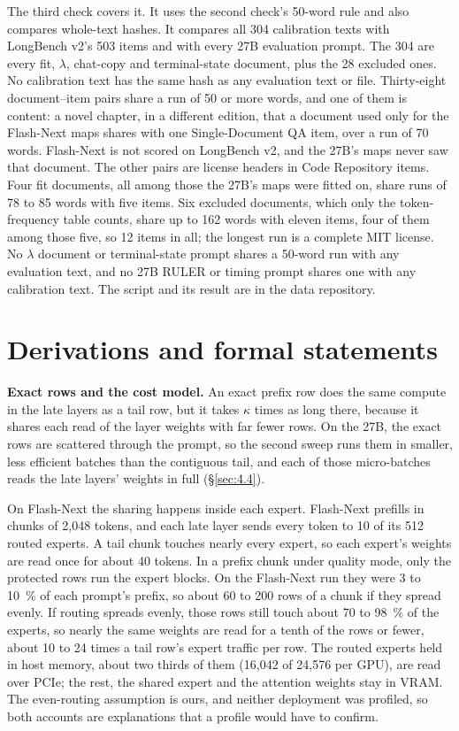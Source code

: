 \documentclass[11pt]{article}
\begin{document}
The third check covers it. It uses the second check's 50-word rule and also compares whole-text hashes. It compares all 304 calibration texts with LongBench v2's 503 items and with every 27B evaluation prompt. The 304 are every fit, $\lambda$, chat-copy and terminal-state document, plus the 28 excluded ones. No calibration text has the same hash as any evaluation text or file. Thirty-eight document--item pairs share a run of 50 or more words, and one of them is content: a novel chapter, in a different edition, that a document used only for the Flash-Next maps shares with one Single-Document QA item, over a run of 70 words. Flash-Next is not scored on LongBench v2, and the 27B's maps never saw that document. The other pairs are license headers in Code Repository items. Four fit documents, all among those the 27B's maps were fitted on, share runs of 78 to 85 words with five items. Six excluded documents, which only the token-frequency table counts, share up to 162 words with eleven items, four of them among those five, so 12 items in all; the longest run is a complete MIT license. No $\lambda$ document or terminal-state prompt shares a 50-word run with any evaluation text, and no 27B RULER or timing prompt shares one with any calibration text. The script and its result are in the data repository.


\section{Derivations and formal statements}\label{app:H}
\textbf{Exact rows and the cost model.} An exact prefix row does the same compute in the late layers as a tail row, but it takes $\kappa$ times as long there, because it shares each read of the layer weights with far fewer rows. On the 27B, the exact rows are scattered through the prompt, so the second sweep runs them in smaller, less efficient batches than the contiguous tail, and each of those micro-batches reads the late layers' weights in full (\S\ref{sec:4.4}).

On Flash-Next the sharing happens inside each expert. Flash-Next prefills in chunks of 2,048 tokens, and each late layer sends every token to 10 of its 512 routed experts. A tail chunk touches nearly every expert, so each expert's weights are read once for about 40 tokens. In a prefix chunk under quality mode, only the protected rows run the expert blocks. On the Flash-Next run they were 3 to 10~\% of each prompt's prefix, so about 60 to 200 rows of a chunk if they spread evenly. If routing spreads evenly, those rows still touch about 70 to 98~\% of the experts, so nearly the same weights are read for a tenth of the rows or fewer, about 10 to 24 times a tail row's expert traffic per row. The routed experts held in host memory, about two thirds of them (16,042 of 24,576 per GPU), are read over PCIe; the rest, the shared expert and the attention weights stay in VRAM. The even-routing assumption is ours, and neither deployment was profiled, so both accounts are explanations that a profile would have to confirm.
\end{document}
